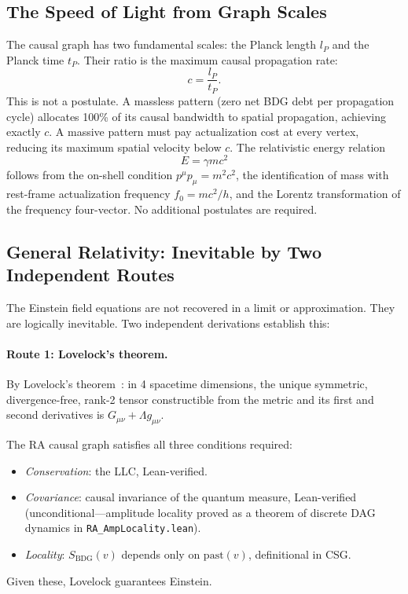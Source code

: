 \documentclass[11pt,a4paper]{article}
\newcommand{\SBDG}{S_{\mathrm{BDG}}}
\begin{document}
\subsection{The Speed of Light from Graph Scales}

The causal graph has two fundamental scales: the Planck length $l_P$ and
the Planck time $t_P$. Their ratio is the maximum causal propagation rate:
\begin{equation}
  c = \frac{l_P}{t_P}.
  \label{eq:c_derived}
\end{equation}
This is not a postulate. A massless pattern (zero net BDG debt per
propagation cycle) allocates 100\% of its causal bandwidth to spatial
propagation, achieving exactly $c$. A massive pattern must pay
actualization cost at every vertex, reducing its maximum spatial velocity
below $c$. The relativistic energy relation
\begin{equation}
  E = \gamma mc^2
  \label{eq:rel_energy}
\end{equation}
follows from the on-shell condition $p^\mu p_\mu = m^2c^2$, the
identification of mass with rest-frame actualization frequency
$f_0 = mc^2/h$, and the Lorentz transformation of the frequency
four-vector. No additional postulates are required.

\subsection{General Relativity: Inevitable by Two Independent Routes}

The Einstein field equations are not recovered in a limit or
approximation. They are logically inevitable. Two independent
derivations establish this:

\paragraph{Route 1: Lovelock's theorem.}
By Lovelock's theorem~\citep{Lovelock1971}: in 4 spacetime dimensions, the unique
symmetric, divergence-free, rank-2 tensor constructible from the
metric and its first and second derivatives is
$G_{\mu\nu} + \Lambda g_{\mu\nu}$.

The RA causal graph satisfies all three conditions required:
\begin{itemize}[noitemsep]
  \item \emph{Conservation}: the LLC, Lean-verified.
  \item \emph{Covariance}: causal invariance of the quantum measure,
  Lean-verified (unconditional---amplitude locality proved as a theorem
  of discrete DAG dynamics in \texttt{RA\_AmpLocality.lean}).
  \item \emph{Locality}: $\SBDG(v)$ depends only on $\mathrm{past}(v)$,
  definitional in CSG.
\end{itemize}
Given these, Lovelock guarantees Einstein.
\end{document}
